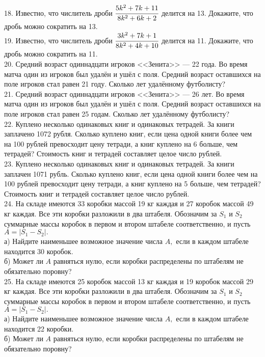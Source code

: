 18. Известно, что числитель дроби $\cfrac{5k^2+7k+11}{8k^2+6k+2}$ делится на 13. Докажите, что дробь можно сократить на 13.\\
19. Известно, что числитель дроби $\cfrac{3k^2+7k+1}{8k^2+4k+10}$ делится на 11. Докажите, что дробь можно сократить на 11.\\
20. Средний возраст одиннадцати игроков <<Зенита>> --- 22 года. Во время матча один из игроков был удалён и ушёл с поля. Средний возраст оставшихся на поле игроков стал равен 21 году. Сколько лет удалённому футболисту?\\
21. Средний  возраст одиннадцати игроков <<Зенита>> --- 26 лет. Во время матча один из игроков был удалён и ушёл с поля. Средний возраст оставшихся на поле игроков стал равен 25 годам. Сколько лет удалённому футболисту?\\
22. Куплено несколько одинаковых книг и одинаковых тетрадей. За книги заплачено 1072 рубля. Сколько куплено книг, если цена одной книги более чем на 100 рублей превосходит цену тетради, а книг куплено на 6 больше, чем тетрадей? Стоимость книг и тетрадей составляет целое число рублей.\\
23. Куплено несколько одинаковых книг и одинаковых тетрадей. За книги заплачен 1071 рубль. Сколько куплено книг, если цена одной книги более чем на 100 рублей превосходит цену тетради, а книг куплено на 5 больше, чем тетрадей? Стоимость книг и тетрадей составляет целое число рублей.\\
24. На складе имеются 33 коробки массой 19 кг каждая и 27 коробок массой 49 кг каждая. Все эти коробки разложили в два штабеля. Обозначим за $S_1$ и $S_2$ суммарные массы коробок в первом и втором штабеле соответственно, и пусть $A=|S_1-S_2|.$\\
а) Найдите наименьшее возможное значение числа $A,$ если в каждом штабеле находится 30 коробок.\\
б) Может ли $A$ равняться нулю, если коробки распределены по штабелям не обязательно поровну?\\
25. На складе имеются 25 коробок массой 13 кг каждая и 19 коробок массой 29 кг каждая. Все эти коробки разложили в два штабеля. Обозначим за $S_1$ и $S_2$ суммарные массы коробок в первом и втором штабеле соответственно, и пусть $A=|S_1-S_2|.$\\
а) Найдите наименьшее возможное значение числа $A,$ если в каждом штабеле находится 22 коробки.\\
б) Может ли $A$ равняться нулю, если коробки распределены по штабелям не обязательно поровну?\\
